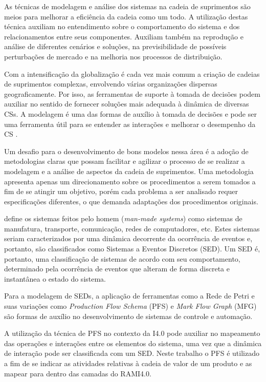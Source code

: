 	As técnicas de modelagem e análise dos sistemas na cadeia de suprimentos são meios para melhorar a eficiência da cadeia como um todo. A utilização destas técnica auxiliam no entendimento sobre o comportamento do sistema e dos relacionamentos entre seus componentes. Auxiliam também na reprodução e análise de diferentes cenários e soluções, na previsibilidade de possíveis perturbações de mercado e na melhoria nos processos de distribuição.
	
	Com a intensificação da globalização é cada vez mais comum a criação de cadeias de suprimentos complexas, envolvendo várias organizações dispersas geograficamente. Por isso, as ferramentas de suporte à tomada de decisões podem auxiliar no sentido de fornecer soluções mais adequada à dinâmica de diversas CSs. A modelagem é uma das formas de auxílio à tomada de decisões e pode ser uma ferramenta útil para se entender as interações e melhorar o desempenho da CS \cite{oliveira2016supplychain}.
	
	Um desafio para o desenvolvimento de bons modelos nessa área é a adoção de metodologias claras que possam facilitar e agilizar o processo de se realizar a modelagem e a análise de aspectos da cadeia de suprimentos. Uma metodologia apresenta apenas um direcionamento sobre os procedimentos a serem tomados a fim de se atingir um objetivo, porém cada problema a ser analisado requer especificações diferentes, o que demanda adaptações dos procedimentos originais.
	
	 define os sistemas feitos pelo homem (\textit{man-made systems}) como sistemas de manufatura, transporte, comunicação, redes de computadores, etc. Estes sistemas seriam caracterizados por uma dinâmica decorrente da ocorrência de eventos e, portanto, são classificados como Sistemas a Eventos Discretos (SED). Um SED é, portanto, uma classificação de sistemas de acordo com seu comportamento, determinado pela ocorrência de eventos que alteram de forma discreta e instantânea o estado do sistema.
	
	Para a modelagem de SEDs, a aplicação de ferramentas como a Rede de Petri e suas variações como \textit{Production Flow Schema} (PFS) e \textit{Mark Flow Graph} (MFG) são formas de auxílio no desenvolvimento de sistemas de controle e automação.
	
	A utilização da técnica de PFS no contexto da I4.0 pode auxiliar no mapeamento das operações e interações entre os elementos do sistema, uma vez que a dinâmica de interação pode ser classificada com um SED. Neste trabalho o PFS é utilizado a fim de se indicar as atividades relativas à cadeia de valor de um produto e as mapear para dentro das camadas do RAMI4.0.
	
